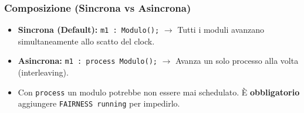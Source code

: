 \documentclass{article}
\begin{document}
\subsubsection*{Composizione (Sincrona vs Asincrona)}
\begin{itemize}
    \item \textbf{Sincrona (Default):} \texttt{m1 : Modulo();} $\rightarrow$ Tutti i moduli avanzano simultaneamente allo scatto del clock.
    \item \textbf{Asincrona:} \texttt{m1 : process Modulo();} $\rightarrow$ Avanza un solo processo alla volta (interleaving).
    \item Con \texttt{process} un modulo potrebbe non essere mai schedulato. È \textbf{obbligatorio} aggiungere \texttt{FAIRNESS running} per impedirlo.
\end{itemize}
\end{document}
